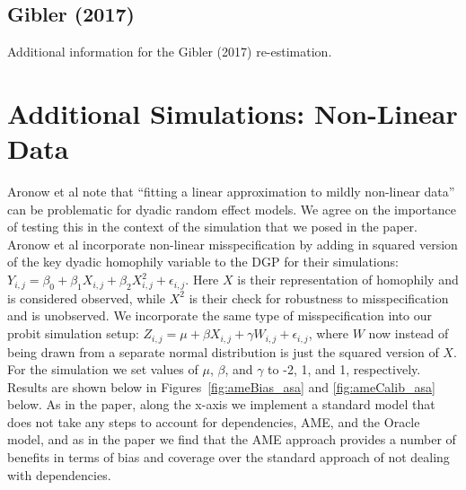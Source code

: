 \subsection*{Gibler (2017)}

Additional information for the Gibler (2017) re-estimation.


\FloatBarrier

\FloatBarrier
\clearpage


\section{Additional Simulations: Non-Linear Data}

Aronow et al note that ``fitting a linear approximation to mildly non-linear data'' can be problematic for dyadic random effect models. We agree on the importance of testing this in the context of the simulation that we posed in the paper. Aronow et al incorporate non-linear misspecification by adding in squared version of the key dyadic homophily variable to the DGP for their simulations: $Y_{i,j} = \beta_{0} + \beta_{1} X_{i,j} + \beta_{2} X_{i,j}^{2} + \epsilon_{i,j}$. Here $X$ is their representation of homophily and is considered observed, while $X^{2}$ is their check for robustness to misspecification and is unobserved. We incorporate the same type of misspecification into our probit simulation setup: $Z_{i,j} =  \mu + \beta X_{i,j} + \gamma W_{i,j} + \epsilon_{i,j}$, where $W$ now instead of being drawn from a separate normal distribution is just the squared version of $X$. For the simulation we set values of $\mu$, $\beta$, and $\gamma$ to -2, 1, and 1, respectively. Results are shown below in Figures~\ref{fig:ameBias_asa} and \ref{fig:ameCalib_asa} below. As in the paper, along the x-axis we implement a standard model that does not take any steps to account for dependencies, AME, and the Oracle model, and as in the paper we find that the AME approach provides a number of benefits in terms of bias and coverage over the standard approach of not dealing with dependencies.

